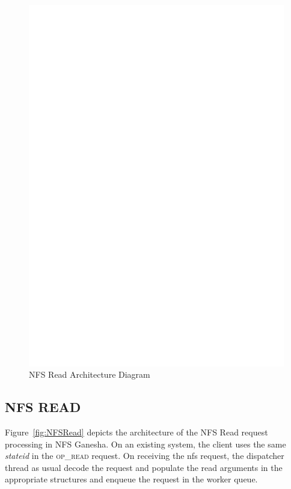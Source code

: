 \begin{figure}
\centering
\includegraphics[scale=0.7]{figures/Read.eps}
\caption{NFS Read Architecture Diagram}
\label{fig:NFSReadArch}
\end{figure}

\subsection{NFS READ}

Figure~\ref{fig:NFSRead} depicts the architecture of the NFS Read request processing in NFS Ganesha. On an existing system, the client uses the same \textit{stateid} in the \textsc{op\_read} request. On receiving the nfs request, the dispatcher thread as usual decode the request and populate the read arguments in the appropriate structures and enqueue the request in the worker queue. 

